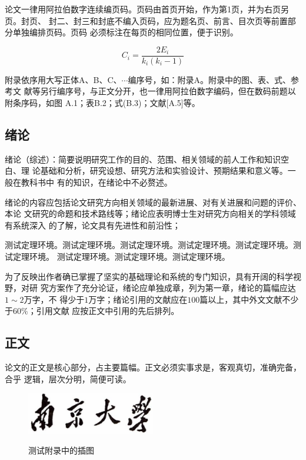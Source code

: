 \documentclass[master]{njuthesis}
\begin{document}
论文一律用阿拉伯数字连续编页码。页码由首页开始，作为第1页，并为右页另页。封页、
封二、封三和封底不编入页码，应为题名页、前言、目次页等前置部分单独编排页码。页码
必须标注在每页的相同位置，便于识别。

\begin{equation}
    C_i = \frac{2E_i}{k_i(k_i-1)}
\end{equation}

附录依序用大写正体A、B、C、$\cdots$编序号，如：附录A。附录中的图、表、式、参考文
献等另行编序号，与正文分开，也一律用阿拉伯数字编码，但在数码前题以附条序码，如图
A.1；表B.2；式(B.3)；文献[A.5]等。

\subsection{绪论}

绪论（综述）：简要说明研究工作的目的、范围、相关领域的前人工作和知识空白、理
论基础和分析，研究设想、研究方法和实验设计、预期结果和意义等。一般在教科书中
有的知识，在绪论中不必赘述。

绪论的内容应包括论文研究方向相关领域的最新进展、对有关进展和问题的评价、本论
文研究的命题和技术路线等；绪论应表明博士生对研究方向相关的学科领域有系统深入
的了解，论文具有先进性和前沿性；

\begin{problem}
测试定理环境。测试定理环境。测试定理环境。测试定理环境。测试定理环境。测试定理环境。
测试定理环境。测试定理环境。测试定理环境。
\end{problem}

为了反映出作者确已掌握了坚实的基础理论和系统的专门知识，具有开阔的科学视野，对研
究方案作了充分论证，绪论应单独成章，列为第一章，绪论的篇幅应达$1\sim 2$万字，不
得少于$1$万字；绪论引用的文献应在$100$篇以上，其中外文文献不少于$60\%$；引用文献
应按正文中引用的先后排列。

\subsection{正文}

论文的正文是核心部分，占主要篇幅。正文必须实事求是，客观真切，准确完备，合乎
逻辑，层次分明，简便可读。

\begin{figure}[htbp]
  \centering
  \includegraphics[width= 0.5\textwidth]{njuname.eps}\\
  \caption{测试附录中的插图}\label{fig:appendix2}
\end{figure}
\end{document}
